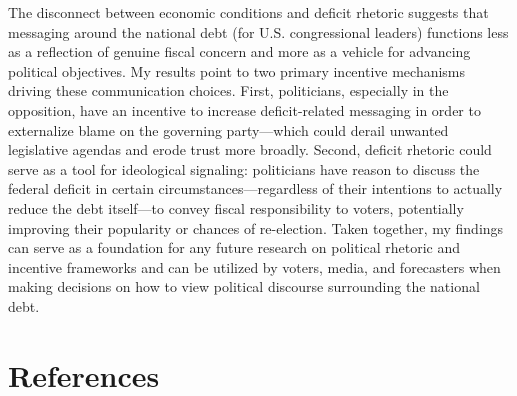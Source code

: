 \documentclass[
  12pt,
]{article}
\begin{document}
The disconnect between economic conditions and deficit rhetoric suggests
that messaging around the national debt (for U.S. congressional leaders)
functions less as a reflection of genuine fiscal concern and more as a
vehicle for advancing political objectives. My results point to two
primary incentive mechanisms driving these communication choices. First,
politicians, especially in the opposition, have an incentive to increase
deficit-related messaging in order to externalize blame on the governing
party---which could derail unwanted legislative agendas and erode trust
more broadly. Second, deficit rhetoric could serve as a tool for
ideological signaling: politicians have reason to discuss the federal
deficit in certain circumstances---regardless of their intentions to
actually reduce the debt itself---to convey fiscal responsibility to
voters, potentially improving their popularity or chances of
re-election. Taken together, my findings can serve as a foundation for
any future research on political rhetoric and incentive frameworks and
can be utilized by voters, media, and forecasters when making decisions
on how to view political discourse surrounding the national debt.

\newpage

\section*{References}\label{references}
\end{document}
